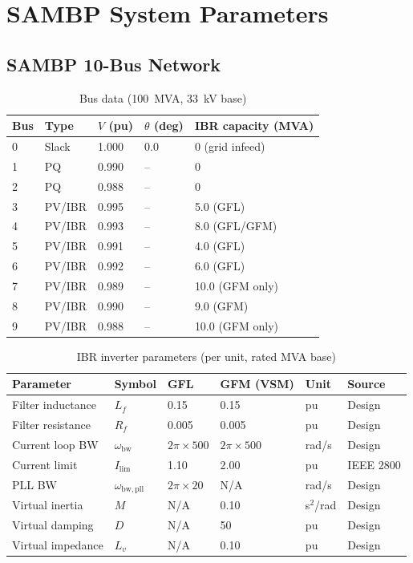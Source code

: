 \chapter{SAMBP System Parameters}
\label{app:data}

\section{SAMBP 10-Bus Network}
\label{app:10bus}

\begin{table}[htbp]
\caption{Bus data (100~MVA, 33~kV base)}
\label{tab:app_bus}
\begin{tabularx}{\textwidth}{@{}lXXXX@{}}
\toprule
Bus & Type & $V$ (pu) & $\theta$ (deg) & IBR capacity (MVA) \\
\midrule
0 & Slack  & 1.000 & 0.0 & 0 (grid infeed) \\
1 & PQ     & 0.990 & --  & 0 \\
2 & PQ     & 0.988 & --  & 0 \\
3 & PV/IBR & 0.995 & --  & 5.0 (GFL) \\
4 & PV/IBR & 0.993 & --  & 8.0 (GFL/GFM) \\
5 & PV/IBR & 0.991 & --  & 4.0 (GFL) \\
6 & PV/IBR & 0.992 & --  & 6.0 (GFL) \\
7 & PV/IBR & 0.989 & --  & 10.0 (GFM only) \\
8 & PV/IBR & 0.990 & --  & 9.0 (GFM) \\
9 & PV/IBR & 0.988 & --  & 10.0 (GFM only) \\
\bottomrule
\end{tabularx}
\end{table}

\begin{table}[htbp]
\caption{IBR inverter parameters (per unit, rated MVA base)}
\label{tab:app_ibr}
\begin{tabularx}{\textwidth}{@{}lXXXXX@{}}
\toprule
Parameter & Symbol & GFL & GFM (VSM) & Unit & Source \\
\midrule
Filter inductance & $L_f$ & 0.15 & 0.15 & pu & Design \\
Filter resistance & $R_f$ & 0.005 & 0.005 & pu & Design \\
Current loop BW & $\omega_\mathrm{bw}$ & $2\pi\times500$ & $2\pi\times500$ & rad/s & Design \\
Current limit & $I_\mathrm{lim}$ & 1.10 & 2.00 & pu & IEEE 2800 \\
PLL BW & $\omega_\mathrm{bw,pll}$ & $2\pi\times20$ & N/A & rad/s & Design \\
Virtual inertia & $M$ & N/A & 0.10 & s$^2$/rad & Design \\
Virtual damping & $D$ & N/A & 50 & pu & Design \\
Virtual impedance & $L_v$ & N/A & 0.10 & pu & Design \\
\bottomrule
\end{tabularx}
\end{table}

